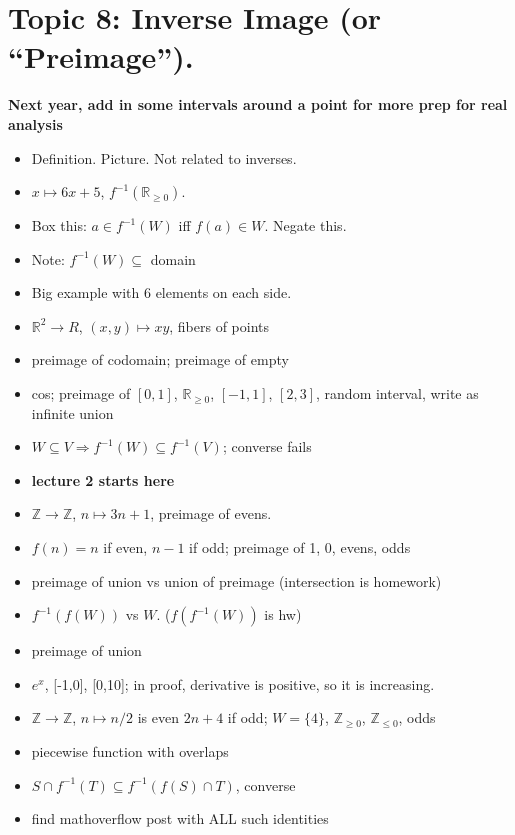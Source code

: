 \documentclass[12pt]{article}
\newcommand{\Z}{{\mathbb Z}}
\newcommand{\R}{{\mathbb R}}
\begin{document}
\newpage
\section[8 (\csname dateWeek8\endcsname): Inverse Image (or ``Preimage'').]{Topic 8: Inverse Image (or ``Preimage'').}

\textbf{Next year, add in some intervals around a point for more prep for real analysis}
\begin{itemize}
\item Definition. Picture. Not related to inverses.
\item $x \mapsto 6x+5$, $f^{-1}(\R_{\geq 0})$.
\item Box this: $a \in f^{-1}(W)$ iff $f(a) \in W$. Negate this.
\item Note: $f^{-1}(W) \subseteq $ domain
\item Big example with 6 elements on each side. 
\item $\R^2 \to R$, $(x,y) \mapsto xy$, fibers of points
\item preimage of codomain; preimage of empty
\item cos; preimage of $[0,1]$, $\R_{\geq 0}$, $[-1,1]$, $[2,3]$, random interval, write as infinite union
\item $W \subseteq V \Rightarrow f^{-1}(W) \subseteq f^{-1}(V)$; converse fails
\item \textbf{lecture 2 starts here}
\item $\Z \to \Z$, $n \mapsto 3n+1$, preimage of evens.
\item $f(n) = n$ if even, $n-1$ if odd; preimage of 1, 0, evens, odds

\item preimage of union vs union of preimage (intersection is homework)
\item $f^{-1}(f(W))$ vs $W$. ($f(f^{-1}(W))$ is hw)
\item preimage of union 
\item $e^x$, [-1,0], [0,10]; in proof, derivative is positive, so it is increasing.
\item $\Z \to \Z$, $n \mapsto n/2$ is even $2n+4$ if odd; $W = \{4\}$, $\Z_{\geq 0}$, $\Z_{\leq 0}$, odds
\item piecewise function with overlaps
\item $S \cap f^{-1}(T) \subseteq f^{-1}(f(S) \cap T)$, converse
\item find mathoverflow post with ALL such identities
\end{itemize}
\end{document}
